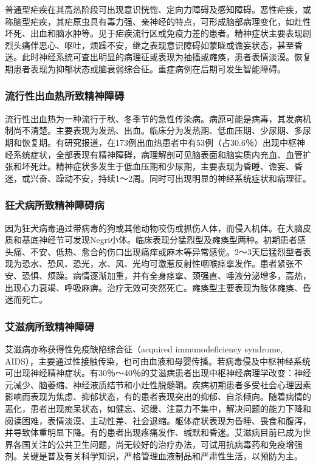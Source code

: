 普通型疟疾在其高热阶段可出现意识恍惚、定向力障碍及感知障碍。恶性疟疾，或称脑型疟疾，其疟原虫具有毒力强、亲神经的特点，可形成脑部病理变化，如灶性坏死、出血和脑水肿等。见于疟疾流行区或免疫力差的患者。精神症状主要表现剧烈头痛伴恶心、呕吐，烦躁不安，继之表现意识障碍如蒙眬或谵妄状态，甚至昏迷。此时神经系统可查出明显的病理征或表现为抽搐或瘫痪，患者表情淡漠。恢复期患者表现为抑郁状态或脑衰弱综合征。重症病例在后期可发生智能障碍。

\subsubsection{流行性出血热所致精神障碍}

流行性出血热为一种流行于秋、冬季节的急性传染病。病原可能是病毒，其发病机制尚不清楚。主要表现为发热、出血。临床分为发热期、低血压期、少尿期、多尿期和恢复期。有研究报道，在173例出血热患者中有53例（占30.6％）出现中枢神经系统症状，全部表现有精神障碍，病理解剖可见脑表面和脑实质内充血、血管扩张和坏死灶。精神症状多发生于低血压期和少尿期，主要表现为昏睡、谵妄、昏迷，或兴奋、躁动不安，持续1～2周。同时可出现明显的神经系统症状和病理征。

\subsubsection{狂犬病所致精神障碍病}

因为狂犬病毒通过带病毒的狗或其他动物咬伤或抓伤人体，而侵入机体。在大脑皮质和基底神经节可发现Negri小体。临床表现分猛烈型及瘫痪型两种。初期患者感头痛、不安、低热、愈合的伤口出现痛痒或麻木等异常感觉。2～3天后猛烈型者表现为恐水、恐风、恐光，水、风、光均可激惹反射性咽喉痉挛发作。患者紧张不安、恐惧、烦躁。病情逐渐加重，并有全身痉挛、颈强直、唾液分泌增多，高热，出现心力衰竭、呼吸麻痹。治疗无效可突然死亡。瘫痪型主要表现为肢体瘫痪、昏迷而死亡。

\subsubsection{艾滋病所致精神障碍}

艾滋病亦称获得性免疫缺陷综合征（acquired immunodeficiency syndrome,
AIDS），主要通过性接触传染，也可由血液和母婴传播。若病毒侵及中枢神经系统可出现神经精神症状。有30％～40％的艾滋病患者出现中枢神经病理学改变：神经元减少、脑萎缩、神经液质结节和小灶性脱髓鞘。疾病初期患者多受社会心理因素影响而表现为焦虑、抑郁状态，有的患者表现突出的抑郁、自杀倾向。随着病情的恶化，患者出现痴呆状态，如健忘、迟缓、注意力不集中，解决问题的能力下降和阅读困难，表情淡漠、主动性差、社会退缩。躯体症状表现为昏睡、畏食和腹泻，并导致体重明显下降。有的患者出现疼痛发作、缄默和昏迷。艾滋病目前已成为世界各国关注的公共卫生问题，尚无较好的治疗办法，可试用抗病毒药和免疫增强剂。关键是普及有关科学知识，严格管理血液制品和严肃性生活，以预防为主。

